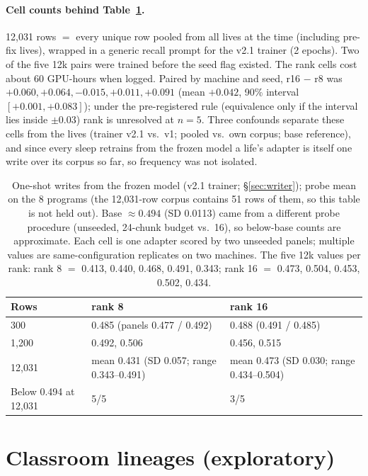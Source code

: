 \documentclass{article}
\begin{document}
\paragraph{Cell counts behind Table~\ref{tab:rankdose}.} 12{,}031 rows $=$ every unique row pooled from all lives at the time (including pre-fix lives), wrapped in a generic recall prompt for the v2.1 trainer (2 epochs). Two of the five 12k pairs were trained before the seed flag existed. The rank cells cost about 60 GPU-hours when logged.
Paired by machine and seed, r16 $-$ r8 was $+0.060, +0.064, -0.015, +0.011, +0.091$ (mean $+0.042$, 90\% interval $[+0.001, +0.083]$); under the pre-registered rule (equivalence only if the interval lies inside $\pm 0.03$) rank is unresolved at $n = 5$. Three confounds separate these cells from the lives (trainer v2.1 vs.\ v1; pooled vs.\ own corpus; base reference), and since every sleep retrains from the frozen model a life's adapter is itself one write over its corpus so far, so frequency was not isolated.

\begin{table}[h]
\centering
\footnotesize
\caption{One-shot writes from the frozen model (v2.1 trainer; \S\ref{sec:writer}); probe mean on the 8 programs (the 12{,}031-row corpus contains 51 rows of them, so this table is not held out). Base $\approx 0.494$ (SD 0.0113) came from a different probe procedure (unseeded, 24-chunk budget vs.\ 16), so below-base counts are approximate. Each cell is one adapter scored by two unseeded panels; multiple values are same-configuration replicates on two machines. The five 12k values per rank: rank 8 $=$ 0.413, 0.440, 0.468, 0.491, 0.343; rank 16 $=$ 0.473, 0.504, 0.453, 0.502, 0.434.}
\label{tab:rankdose}
\begin{tabular}{lll}
\toprule
Rows & rank 8 & rank 16 \\
\midrule
300 & 0.485 (panels 0.477 / 0.492) & 0.488 (0.491 / 0.485) \\
1{,}200 & 0.492, 0.506 & 0.456, 0.515 \\
12{,}031 & mean 0.431 (SD 0.057; range 0.343--0.491) & mean 0.473 (SD 0.030; range 0.434--0.504) \\
Below 0.494 at 12{,}031 & 5/5 & 3/5 \\
\bottomrule
\end{tabular}
\end{table}

\section{Classroom lineages (exploratory)}
\label{app:lineages}
\end{document}
